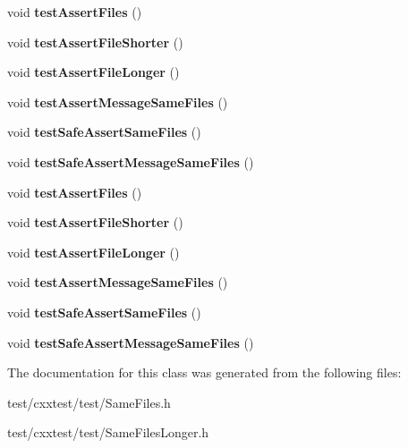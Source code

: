 \begin{DoxyCompactItemize}
\item 
\hypertarget{classSameFiles_a9c96c6006b477d0acfe22d6843503d70}{void {\bfseries test\-Assert\-Files} ()}\label{classSameFiles_a9c96c6006b477d0acfe22d6843503d70}

\item 
\hypertarget{classSameFiles_ad4366510bf557dc9c9fc1a2430639dd2}{void {\bfseries test\-Assert\-File\-Shorter} ()}\label{classSameFiles_ad4366510bf557dc9c9fc1a2430639dd2}

\item 
\hypertarget{classSameFiles_a80755077be59da0b234d775b5f93f8d9}{void {\bfseries test\-Assert\-File\-Longer} ()}\label{classSameFiles_a80755077be59da0b234d775b5f93f8d9}

\item 
\hypertarget{classSameFiles_a06f47d314524d62bed47187260fa3311}{void {\bfseries test\-Assert\-Message\-Same\-Files} ()}\label{classSameFiles_a06f47d314524d62bed47187260fa3311}

\item 
\hypertarget{classSameFiles_a36961a9df59501dade84f498e2a07010}{void {\bfseries test\-Safe\-Assert\-Same\-Files} ()}\label{classSameFiles_a36961a9df59501dade84f498e2a07010}

\item 
\hypertarget{classSameFiles_a97d8c999211f180c90210929d9d56341}{void {\bfseries test\-Safe\-Assert\-Message\-Same\-Files} ()}\label{classSameFiles_a97d8c999211f180c90210929d9d56341}

\item 
\hypertarget{classSameFiles_a9c96c6006b477d0acfe22d6843503d70}{void {\bfseries test\-Assert\-Files} ()}\label{classSameFiles_a9c96c6006b477d0acfe22d6843503d70}

\item 
\hypertarget{classSameFiles_ad4366510bf557dc9c9fc1a2430639dd2}{void {\bfseries test\-Assert\-File\-Shorter} ()}\label{classSameFiles_ad4366510bf557dc9c9fc1a2430639dd2}

\item 
\hypertarget{classSameFiles_a80755077be59da0b234d775b5f93f8d9}{void {\bfseries test\-Assert\-File\-Longer} ()}\label{classSameFiles_a80755077be59da0b234d775b5f93f8d9}

\item 
\hypertarget{classSameFiles_a06f47d314524d62bed47187260fa3311}{void {\bfseries test\-Assert\-Message\-Same\-Files} ()}\label{classSameFiles_a06f47d314524d62bed47187260fa3311}

\item 
\hypertarget{classSameFiles_a36961a9df59501dade84f498e2a07010}{void {\bfseries test\-Safe\-Assert\-Same\-Files} ()}\label{classSameFiles_a36961a9df59501dade84f498e2a07010}

\item 
\hypertarget{classSameFiles_a97d8c999211f180c90210929d9d56341}{void {\bfseries test\-Safe\-Assert\-Message\-Same\-Files} ()}\label{classSameFiles_a97d8c999211f180c90210929d9d56341}

\end{DoxyCompactItemize}


The documentation for this class was generated from the following files\-:\begin{DoxyCompactItemize}
\item 
test/cxxtest/test/Same\-Files.\-h\item 
test/cxxtest/test/Same\-Files\-Longer.\-h\end{DoxyCompactItemize}
